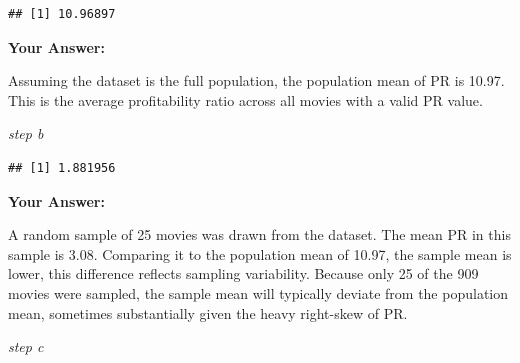 \documentclass[
]{article}
\newenvironment{Shaded}{\begin{snugshade}}{\end{snugshade}}
\newcommand{\AttributeTok}[1]{\textcolor[rgb]{0.13,0.29,0.53}{#1}}
\newcommand{\ConstantTok}[1]{\textcolor[rgb]{0.56,0.35,0.01}{#1}}
\newcommand{\ControlFlowTok}[1]{\textcolor[rgb]{0.13,0.29,0.53}{\textbf{#1}}}
\newcommand{\DecValTok}[1]{\textcolor[rgb]{0.00,0.00,0.81}{#1}}
\newcommand{\FunctionTok}[1]{\textcolor[rgb]{0.13,0.29,0.53}{\textbf{#1}}}
\newcommand{\NormalTok}[1]{#1}
\newcommand{\OtherTok}[1]{\textcolor[rgb]{0.56,0.35,0.01}{#1}}
\newcommand{\SpecialCharTok}[1]{\textcolor[rgb]{0.81,0.36,0.00}{\textbf{#1}}}
\begin{document}
\begin{verbatim}
## [1] 10.96897
\end{verbatim}

\textbf{Your Answer:}

Assuming the dataset is the full population, the population mean of PR
is 10.97. This is the average profitability ratio across all movies with
a valid PR value.

\emph{step b}

\begin{Shaded}
\end{Shaded}

\begin{verbatim}
## [1] 1.881956
\end{verbatim}

\textbf{Your Answer:}

A random sample of 25 movies was drawn from the dataset. The mean PR in
this sample is 3.08. Comparing it to the population mean of 10.97, the
sample mean is lower, this difference reflects sampling variability.
Because only 25 of the 909 movies were sampled, the sample mean will
typically deviate from the population mean, sometimes substantially
given the heavy right-skew of PR.

\emph{step c}

\begin{Shaded}
\end{Shaded}
\end{document}
